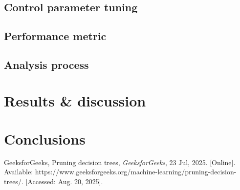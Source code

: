 \documentclass[conference]{IEEEtran}
\begin{document}
\subsection{Control parameter tuning}

\subsection{Performance metric}

\subsection{Analysis process}

\section{Results \& discussion}

\section{Conclusions}

\begin{thebibliography}{00}
 GeeksforGeeks, Pruning decision trees, {\em GeeksforGeeks}, 23 Jul, 2025. [Online]. Available: https://www.geeksforgeeks.org/machine-learning/pruning-decision-trees/. [Accessed: Aug. 20, 2025].
\end{thebibliography}
\vspace{12pt}
\end{document}
